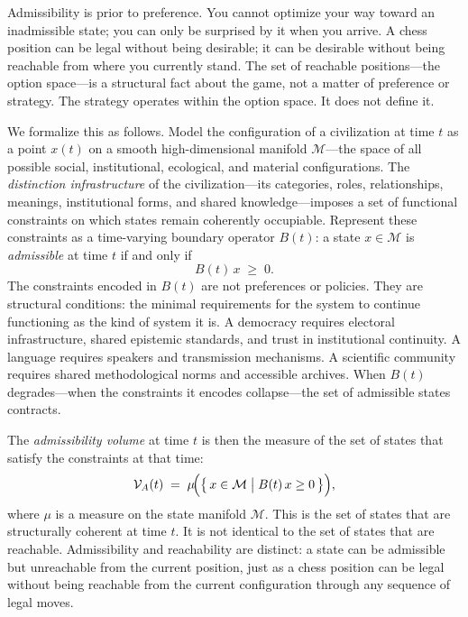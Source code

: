 \documentclass[11pt, letterpaper]{article}
\begin{document}
Admissibility is prior to preference. You cannot optimize your way toward an inadmissible state; you can only be surprised by it when you arrive. A chess position can be legal without being desirable; it can be desirable without being reachable from where you currently stand. The set of reachable positions---the option space---is a structural fact about the game, not a matter of preference or strategy. The strategy operates within the option space. It does not define it.

We formalize this as follows. Model the configuration of a civilization at time $t$ as a point $x(t)$ on a smooth high-dimensional manifold $\mathcal{M}$---the space of all possible social, institutional, ecological, and material configurations. The \emph{distinction infrastructure} of the civilization---its categories, roles, relationships, meanings, institutional forms, and shared knowledge---imposes a set of functional constraints on which states remain coherently occupiable. Represent these constraints as a time-varying boundary operator $B(t)$: a state $x \in \mathcal{M}$ is \emph{admissible} at time $t$ if and only if
\[
  B(t)\,x \;\geq\; 0.
\]
The constraints encoded in $B(t)$ are not preferences or policies. They are structural conditions: the minimal requirements for the system to continue functioning as the kind of system it is. A democracy requires electoral infrastructure, shared epistemic standards, and trust in institutional continuity. A language requires speakers and transmission mechanisms. A scientific community requires shared methodological norms and accessible archives. When $B(t)$ degrades---when the constraints it encodes collapse---the set of admissible states contracts.

The \emph{admissibility volume} at time $t$ is then the measure of the set of states that satisfy the constraints at that time:
\[
  \mathcal{V}_A(t) \;=\; \mu\!\Bigl(\bigl\{\,x \in \mathcal{M} \;\big|\; B(t)\,x \geq 0\,\bigr\}\Bigr),
\]
where $\mu$ is a measure on the state manifold $\mathcal{M}$. This is the set of states that are structurally coherent at time $t$. It is not identical to the set of states that are reachable. Admissibility and reachability are distinct: a state can be admissible but unreachable from the current position, just as a chess position can be legal without being reachable from the current configuration through any sequence of legal moves.
\end{document}

